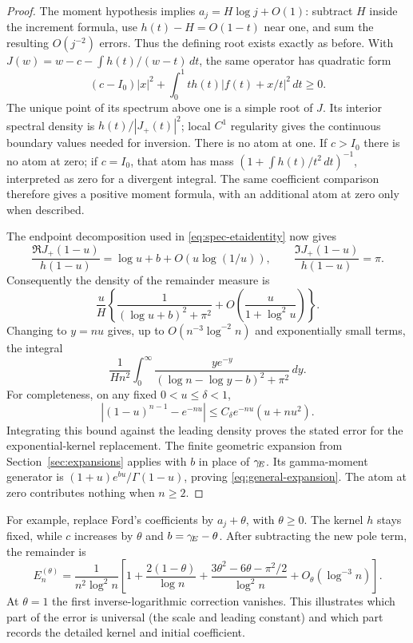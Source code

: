 \begin{proof}
The moment hypothesis implies $a_j=H\log j+O(1)$: subtract $H$
inside the increment formula, use $h(t)-H=O(1-t)$ near one,
and sum the resulting $O(j^{-2})$ errors. Thus the defining root
exists exactly as before. With
$J(w)=w-c-\int h(t)/(w-t)\,dt$, the same operator has quadratic
form
\[
 (c-I_0)|x|^2+\int_0^1t h(t)|f(t)+x/t|^2\,dt\ge0.
\]
The unique point of its spectrum above one is a simple root of $J$.
Its interior spectral density is $h(t)/|J_+(t)|^2$; local $C^1$
regularity gives the continuous boundary values needed for inversion.
There is no atom at one. If $c>I_0$ there is no atom at zero; if
$c=I_0$, that atom has mass
$(1+\int h(t)/t^2\,dt)^{-1}$, interpreted as zero for a divergent
integral. The same coefficient comparison therefore gives a positive
moment formula, with an additional atom at zero only when described.

The endpoint decomposition used in
\eqref{eq:spec-etaidentity} now gives
\[
 \frac{\Re J_+(1-u)}{h(1-u)}
      =\log u+b+O(u\log(1/u)),\qquad
 \frac{\Im J_+(1-u)}{h(1-u)}=\pi.
\]
Consequently the density of the remainder measure is
\[
 \frac{u}{H}\left\{
  \frac1{(\log u+b)^2+\pi^2}
              +O\!\left(\frac{u}{1+\log^2u}\right)\right\}.
\]
Changing to $y=nu$ gives, up to
$O(n^{-3}\log^{-2}n)$ and exponentially small terms, the integral
\[
 \frac1{Hn^2}\int_0^\infty
 \frac{ye^{-y}}{(\log n-\log y-b)^2+\pi^2}\,dy.
\]
For completeness, on any fixed $0<u\le\delta<1$,
\[
 |(1-u)^{n-1}-e^{-nu}|
       \le C_\delta e^{-nu}(u+nu^2).
\]
Integrating this bound against the leading density proves the stated
error for the exponential-kernel replacement.
The finite geometric expansion from Section~\ref{sec:expansions}
applies with $b$ in place of $\gamma_{\!E}$. Its gamma-moment generator is
$(1+u)e^{bu}/\Gamma(1-u)$, proving
\eqref{eq:general-expansion}. The atom at zero contributes nothing
when $n\ge2$.
\end{proof}

For example, replace Ford's coefficients by $a_j+\theta$, with
$\theta\ge0$. The kernel $h$ stays fixed, while $c$ increases by
$\theta$ and $b=\gamma_{\!E}-\theta$. After subtracting the new pole term,
the remainder is
\begin{equation}\label{eq:shifted-family}
 E_n^{(\theta)}=\frac1{n^2\log^2n}
 \left[1+\frac{2(1-\theta)}{\log n}
       +\frac{3\theta^2-6\theta-\pi^2/2}{\log^2n}
       +O_\theta(\log^{-3}n)\right].
\end{equation}
At $\theta=1$ the first inverse-logarithmic correction vanishes.
This illustrates which part of the error is universal (the scale
and leading constant) and which part records the detailed kernel
and initial coefficient.
